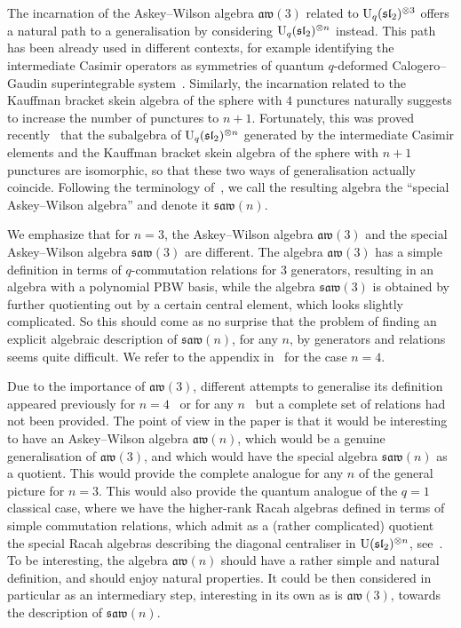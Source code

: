\documentclass[10pt,a4paper]{amsart}
\numberwithin{equation}{section}
\theoremstyle{definition}
\newcommand{\aw}{\mathfrak{aw}(n)}
\newcommand{\saw}{\mathfrak{saw}(n)}
\begin{document}
The incarnation of the Askey--Wilson algebra $\mathfrak{aw}(3)$ related to ${\rm U}_q(\mathfrak{sl}_2)^{\otimes 3}$ offers a natural path to a generalisation by considering ${\rm U}_q(\mathfrak{sl}_2)^{\otimes n}$ instead. This path has been already used in different contexts, for example identifying the intermediate Casimir operators as symmetries of quantum $q$-deformed Calogero--Gaudin superintegrable system~\cite{GIV}.
Similarly, the incarnation related to the
Kauffman bracket skein algebra of the sphere with $4$ punctures naturally suggests to increase the number of punctures to $n+1$. Fortunately, this was proved recently~\cite{CL} that the subalgebra of
${\rm U}_q(\mathfrak{sl}_2)^{\otimes n}$ generated by the intermediate Casimir elements and the Kauffman bracket skein algebra of the sphere with $n+1$ punctures
are isomorphic, so that these two ways of generalisation actually coincide. Following the terminology of~\cite{avatar}, we call the resulting algebra the ``special Askey--Wilson algebra'' and denote it $\saw$.

We emphasize that for $n=3$, the Askey--Wilson algebra $\mathfrak{aw}(3)$ and the special Askey--Wilson algebra $\mathfrak{saw}(3)$ are different.
The algebra $\mathfrak{aw}(3)$ has a simple definition in terms of $q$-commutation relations for 3 generators, resulting in an algebra with a polynomial PBW basis,
while the algebra $\mathfrak{saw}(3)$ is obtained by further quotienting out by a certain central element, which looks slightly complicated.
So this should come as no surprise that the problem of finding an explicit algebraic description of $\saw$, for any $n$, by generators and relations seems quite difficult.
We refer to the appendix in~\cite{CL} for the case $n=4$.

Due to the importance of $\mathfrak{aw}(3)$, different attempts to generalise its definition appeared previously for $n=4$~\cite{GW, PostWalt} or for any $n$~\cite{dBdC,dBdCvdV, DeC} but a complete set of relations had not been provided.
The point of view in the paper is that it would be interesting to have an Askey--Wilson algebra $\aw$,
which would be a genuine generalisation of $\mathfrak{aw}(3)$, and which would have the special algebra $\saw$ as a quotient.
This would provide the complete analogue for any $n$ of the general picture for $n=3$. This would also provide the quantum analogue of the $q=1$ classical case, where we have the higher-rank Racah algebras defined in terms of simple commutation relations, which admit as a (rather complicated) quotient the special Racah algebras describing the diagonal centraliser in ${\rm U}(\mathfrak{sl}_2)^{\otimes n}$, see~\cite{CGPV}. To be interesting, the algebra $\aw$ should have a rather simple and natural definition, and should enjoy natural properties. It could be then considered in particular as an intermediary step, interesting in its own as is $\mathfrak{aw}(3)$, towards the description of $\saw$.
\end{document}
